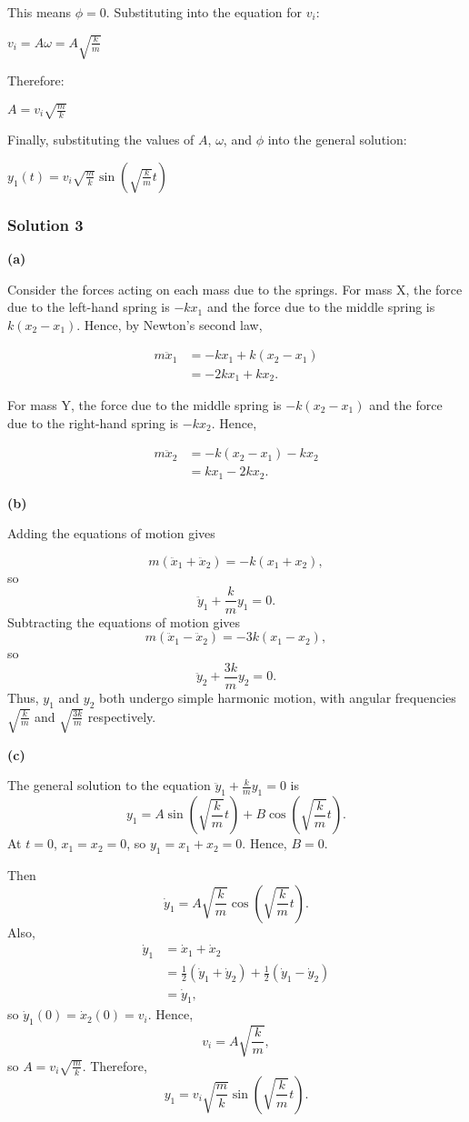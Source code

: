 \documentclass{article}
\begin{document}
This means $\phi = 0$.  Substituting into the equation for $v_i$:

$v_i = A\omega = A\sqrt{\frac{k}{m}}$

Therefore:

$A = v_i\sqrt{\frac{m}{k}}$

Finally, substituting the values of $A$, $\omega$, and $\phi$ into the general solution:

$y_1(t) = v_i \sqrt{\frac{m}{k}} \sin(\sqrt{\frac{k}{m}} t)$ 

\subsubsection{Solution 3}
\textbf{(a)}

Consider the forces acting on each mass due to the springs.  For mass X, the force due to the left-hand spring is $-kx_1$ and the force due to the middle spring is $k(x_2 - x_1)$.  Hence, by Newton's second law,

\begin{align*}
m\ddot{x}_1 &= -kx_1 + k(x_2 - x_1) \\
&= -2kx_1 + kx_2.
\end{align*}

For mass Y, the force due to the middle spring is $-k(x_2 - x_1)$ and the force due to the right-hand spring is $-kx_2$.  Hence,

\begin{align*}
m\ddot{x}_2 &= -k(x_2 - x_1) - kx_2 \\
&= kx_1 - 2kx_2.
\end{align*}

\textbf{(b)}

Adding the equations of motion gives

\[m(\ddot{x}_1 + \ddot{x}_2) = -k(x_1 + x_2),\]so
\[\ddot{y}_1 + \frac{k}{m}y_1 = 0.\]Subtracting the equations of motion gives
\[m(\ddot{x}_1 - \ddot{x}_2) = -3k(x_1 - x_2),\]so
\[\ddot{y}_2 + \frac{3k}{m}y_2 = 0.\]Thus, $y_1$ and $y_2$ both undergo simple harmonic motion, with angular frequencies $\sqrt{\frac{k}{m}}$ and $\sqrt{\frac{3k}{m}}$ respectively.

\textbf{(c)}

The general solution to the equation $\ddot{y}_1 + \frac{k}{m}y_1 = 0$ is
\[y_1 = A \sin \left( \sqrt{\frac{k}{m}} t \right) + B \cos \left( \sqrt{\frac{k}{m}} t \right).\]At $t = 0$, $x_1 = x_2 = 0$, so $y_1 = x_1 + x_2 = 0$.  Hence, $B = 0$.

Then
\[\dot{y}_1 = A \sqrt{\frac{k}{m}} \cos \left( \sqrt{\frac{k}{m}} t \right).\]Also,
\begin{align*}
\dot{y}_1 &= \dot{x}_1 + \dot{x}_2 \\
&= \frac{1}{2} (\dot{y}_1 + \dot{y}_2) + \frac{1}{2} (\dot{y}_1 - \dot{y}_2) \\
&= \dot{y}_1,
\end{align*}so $\dot{y}_1 (0) = \dot{x}_2 (0) = v_i$.  Hence,
\[v_i = A \sqrt{\frac{k}{m}},\]so $A = v_i \sqrt{\frac{m}{k}}$.  Therefore,
\[y_1 = v_i \sqrt{\frac{m}{k}} \sin \left( \sqrt{\frac{k}{m}} t \right).\]
\end{document}
